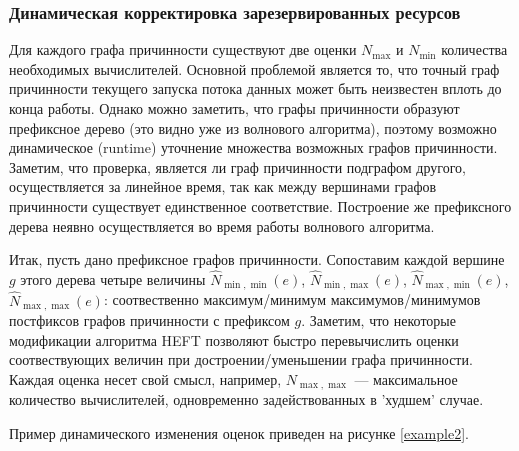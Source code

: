 \documentclass[10pt,a4paper]{article}
\begin{document}
 \subsubsection{Динамическая корректировка зарезервированных ресурсов}
   Для каждого графа причинности существуют две оценки $N_{\max}$ и $N_{\min}$ количества необходимых вычислителей.
   Основной проблемой является то, что точный граф причинности текущего запуска потока данных может быть неизвестен вплоть до конца работы.
   Однако можно заметить, что графы причинности образуют префиксное дерево (это видно уже из волнового алгоритма), поэтому возможно
   динамическое (runtime) уточнение множества возможных графов причинности. Заметим, что проверка, является ли граф причинности подграфом другого, осуществляется
   за линейное время, так как между вершинами графов причинности существует единственное соответствие. Построение же префиксного дерева неявно осуществляется во время работы
   волнового алгоритма.
   
   Итак, пусть дано префиксное графов причинности. Сопоставим каждой вершине $g$ этого дерева четыре величины $\hat{N}_{\min, \min}(e)$, $\hat{N}_{\min, \max}(e)$,
   $\hat{N}_{\max, \min}(e)$, $\hat{N}_{\max, \max}(e)$: соотвественно максимум/минимум максимумов/минимумов постфиксов графов причинности с префиксом $g$.
   Заметим, что некоторые модификации алгоритма HEFT позволяют быстро перевычислить оценки соотвествующих величин при достроении/уменьшении графа причинности.
   Каждая оценка несет свой смысл, например, $N_{\max, \max}$ --- максимальное количество вычислителей, одновременно задействованных в 'худшем' случае.
   
   Пример динамического изменения оценок приведен на рисунке \ref{example2}.
   
\end{document}
